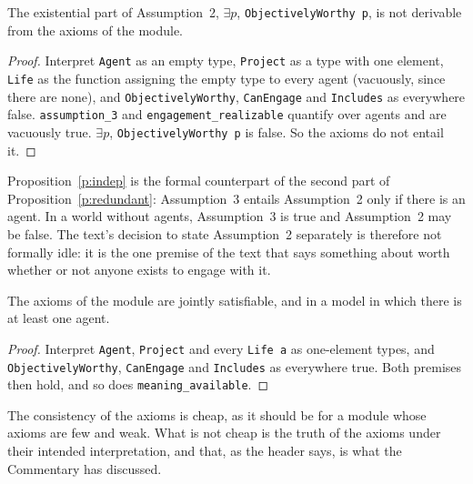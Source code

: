 \begin{proposition}\label{p:indep}
The existential part of Assumption~2, $\exists p$, \texttt{ObjectivelyWorthy p}, is not derivable from the axioms of the module.
\end{proposition}

\begin{proof}
Interpret \texttt{Agent} as an empty type, \texttt{Project} as a type with one element, \texttt{Life} as the function assigning the empty type to every agent (vacuously, since there are none), and \texttt{ObjectivelyWorthy}, \texttt{CanEngage} and \texttt{Includes} as everywhere false. \texttt{assumption\_3} and \texttt{engagement\_realizable} quantify over agents and are vacuously true. $\exists p$, \texttt{ObjectivelyWorthy p} is false. So the axioms do not entail it.
\end{proof}

Proposition~\ref{p:indep} is the formal counterpart of the second part of Proposition~\ref{p:redundant}: Assumption~3 entails Assumption~2 only if there is an agent. In a world without agents, Assumption~3 is true and Assumption~2 may be false. The text's decision to state Assumption~2 separately is therefore not formally idle: it is the one premise of the text that says something about worth whether or not anyone exists to engage with it.

\begin{proposition}[Consistency]\label{p:consistent}
The axioms of the module are jointly satisfiable, and in a model in which there is at least one agent.
\end{proposition}

\begin{proof}
Interpret \texttt{Agent}, \texttt{Project} and every \texttt{Life a} as one-element types, and \texttt{ObjectivelyWorthy}, \texttt{CanEngage} and \texttt{Includes} as everywhere true. Both premises then hold, and so does \texttt{meaning\_available}.
\end{proof}

The consistency of the axioms is cheap, as it should be for a module whose axioms are few and weak. What is not cheap is the truth of the axioms under their intended interpretation, and that, as the header says, is what the Commentary has discussed.

